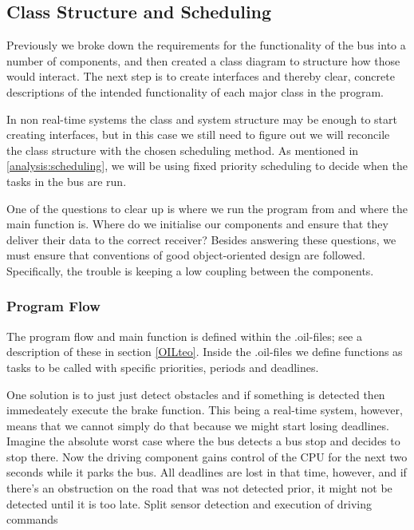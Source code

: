 \subsection{Class Structure and Scheduling}

Previously we broke down the requirements for the functionality of the bus into a number of components, and then created a class diagram  to structure how those would interact. The next step is to create interfaces and thereby clear, concrete descriptions of the intended functionality of each major class in the program. 

In non real-time systems the class and system structure may be enough to start creating interfaces, but in this case we still need to figure out we will reconcile the class structure with the chosen scheduling method. As mentioned in \ref{analysis:scheduling}, we will be using fixed priority scheduling to decide when the tasks in the bus are run. 

One of the questions to clear up is where we run the program from and where the main function is. Where do we initialise our components and ensure that they deliver their data to the correct receiver? Besides answering these questions, we must ensure that conventions of good object-oriented design are followed. Specifically, the trouble is keeping a low coupling between the components. 

\subsubsection{Program Flow}
The program flow and main function is defined within the .oil-files; see a description of these in section \ref{OILteo}. Inside the .oil-files we define functions as tasks to be called with specific priorities, periods and deadlines. 






One solution is to just just detect obstacles and if something is detected then immedeately execute the brake function. This being a real-time system, however, means that we cannot simply do that because we might start losing deadlines. Imagine the absolute worst case where the bus detects a bus stop and decides to stop there. Now the driving component gains control of the CPU for the next two seconds while it parks the bus. All deadlines are lost in that time, however, and if there's an obstruction on the road that was not detected prior, it might not be detected until it is too late. 
Split sensor detection and execution of driving commands



